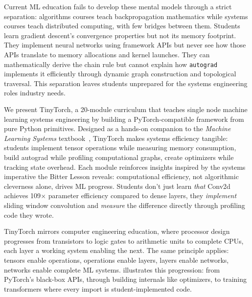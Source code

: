 \documentclass[10pt,twocolumn]{article}
\begin{document}
Current ML education fails to develop these mental models through a strict separation: algorithms courses teach backpropagation mathematics while systems courses teach distributed computing, with few bridges between them. Students learn gradient descent's convergence properties but not its memory footprint. They implement neural networks using framework APIs but never see how those APIs translate to memory allocations and kernel launches. They can mathematically derive the chain rule but cannot explain how \texttt{autograd} implements it efficiently through dynamic graph construction and topological traversal. This separation leaves students unprepared for the systems engineering roles industry needs.

We present TinyTorch, a 20-module curriculum that teaches single node machine learning systems engineering by building a PyTorch-compatible framework from pure Python primitives. Designed as a hands-on companion to the \emph{Machine Learning Systems} textbook~\citep{mlsysbook2025}, TinyTorch makes systems efficiency tangible: students implement tensor operations while measuring memory consumption, build autograd while profiling computational graphs, create optimizers while tracking state overhead. Each module reinforces insights inspired by the systems imperative the Bitter Lesson reveals: computational efficiency, not algorithmic cleverness alone, drives ML progress. Students don't just learn \emph{that} Conv2d achieves 109$\times$ parameter efficiency compared to dense layers, they \emph{implement} sliding window convolution and \emph{measure} the difference directly through profiling code they wrote.

TinyTorch mirrors computer engineering education, where processor design progresses from transistors to logic gates to arithmetic units to complete CPUs, each layer a working system enabling the next. The same principle applies: tensors enable operations, operations enable layers, layers enable networks, networks enable complete ML systems.  illustrates this progression: from PyTorch's black-box APIs, through building internals like optimizers, to training transformers where every import is student-implemented code.
\end{document}
